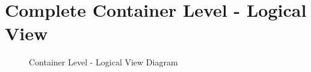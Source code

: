 \chapter{Complete Container Level - Logical View}
\label{AppendixB}

\begin{landscape}
    \begin{figure}[H]
       \centering
    \resizebox{\columnwidth}{!}
    {      
       
    }
    \caption[Container Level - Logical View Diagram]{Container Level - Logical View Diagram}
       \label{fig:AppendixB:complete}
    \end{figure}
 \end{landscape}
